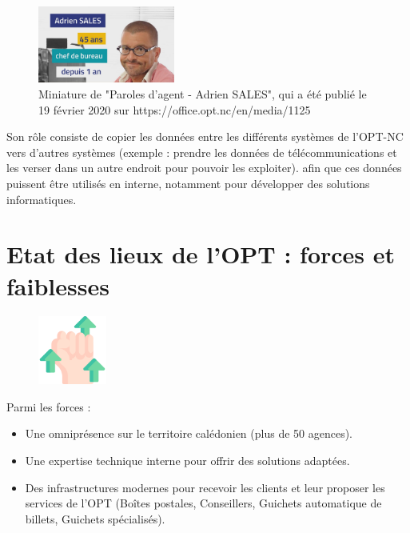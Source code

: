 \documentclass[12pt,a4paper]{report}
\begin{document}
\vspace{1cm}
\begin{figure}[h] %
    \centering
    \includegraphics[width=0.4\textwidth]{ressources_rapport/paroles_agent.jpg}
    \caption{Miniature de "Paroles d'agent - Adrien SALES", qui a été publié le 19 février 2020 sur https://office.opt.nc/en/media/1125}
    \label{fig:exemple}
\end{figure}
Son rôle consiste de copier les données entre les différents systèmes de l'OPT-NC vers d'autres systèmes (exemple : prendre les données de télécommunications et les verser dans un autre endroit pour pouvoir les exploiter). afin que ces données puissent être utilisés en interne, notamment pour développer des solutions informatiques.
\newpage

\section{Etat des lieux de l'OPT : forces et faiblesses}
\begin{figure}[h] %
    \centering
    \includegraphics[width=0.2\textwidth]{ressources_rapport/forces.png}
\end{figure}
Parmi les forces : 
\begin{itemize}
    \item Une omniprésence sur le territoire calédonien (plus de 50 agences).
    \item Une expertise technique interne pour offrir des solutions adaptées.
    \item Des infrastructures modernes pour recevoir les clients et leur proposer les services de l'OPT (Boîtes postales, Conseillers, Guichets automatique de billets, Guichets spécialisés).
\end{itemize}
\end{document}
